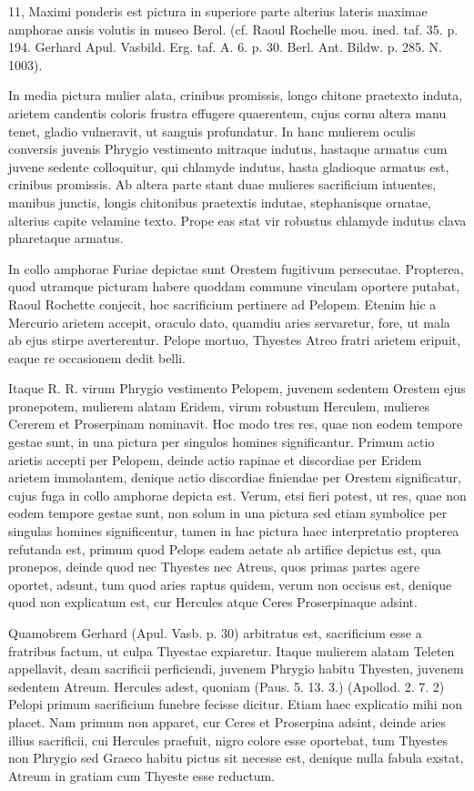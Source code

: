 \documentclass[landscape, a4paper, 11pt, oneside, polutonikogreek, german]{article}
\begin{document}
11, Maximi ponderis est pictura in superiore parte alterius lateris maximae amphorae ansis volutis in museo Berol. (cf. Raoul Rochelle mou. ined. taf. 35. p. 194. Gerhard Apul. Vasbild. Erg. taf. A. 6. p. 30. Berl. Ant. Bildw. p. 285. N. 1003).

In media pictura mulier alata, crinibus promissis, longo chitone praetexto induta, arietem candentis coloris frustra effugere quaerentem, cujus cornu altera manu tenet, gladio vulneravit, ut sanguis profundatur. In hanc mulierem oculis conversis juvenis Phrygio vestimento mitraque indutus, hastaque armatus cum juvene sedente colloquitur, qui chlamyde indutus, hasta gladioque armatus est, crinibus promissis. Ab altera parte stant duae mulieres sacrificium intuentes, manibus junctis, longis chitonibus praetextis indutae, stephanisque ornatae, alterius capite velamine texto. Prope eas stat vir robustus chlamyde indutus clava pharetaque armatus.

In collo amphorae Furiae depictae sunt Orestem fugitivum persecutae. Propterea, quod utramque picturam habere quoddam commune vinculam oportere putabat, Raoul Rochette conjecit, hoc sacrificium pertinere ad Pelopem. Etenim hic a Mercurio arietem accepit, oraculo dato, quamdiu aries servaretur, fore, ut mala ab ejus stirpe averterentur. Pelope mortuo, Thyestes Atreo fratri arietem eripuit, eaque re occasionem dedit belli.

Itaque R. R. virum Phrygio vestimento Pelopem, juvenem sedentem Orestem ejus pronepotem, mulierem alatam Eridem, virum robustum Herculem, mulieres Cererem et Proserpinam nominavit. Hoc modo tres res, quae non eodem tempore gestae sunt, in una pictura per singulos homines significantur. Primum actio arietis accepti per Pelopem, deinde actio rapinae et discordiae per Eridem arietem immolantem, denique actio discordiae finiendae per Orestem significatur, cujus fuga in collo amphorae depicta est. Verum, etsi fieri potest, ut res, quae non eodem tempore gestae sunt, non solum in una pictura sed etiam symbolice per singulas homines significentur, tamen in hac pictura haec interpretatio propterea refutanda est, primum quod Pelops eadem aetate ab artifice depictus est, qua pronepos, deinde quod nec Thyestes nec Atreus, quos primas partes agere oportet, adsunt, tum quod aries raptus quidem, verum non occisus est, denique quod non explicatum est, cur Hercules atque Ceres Proserpinaque adsint.

Quamobrem Gerhard (Apul. Vasb. p. 30) arbitratus est, sacrificium esse a fratribus factum, ut culpa Thyestae expiaretur. Itaque mulierem alatam Teleten appellavit, deam sacrificii perficiendi, juvenem Phrygio habitu Thyesten, juvenem sedentem Atreum. Hercules adest, quoniam (Paus. 5. 13. 3.) (Apollod. 2. 7. 2) Pelopi primum sacrificium funebre fecisse dicitur. Etiam haec explicatio mihi non placet. Nam primum non apparet, cur Ceres et Proserpina adsint, deinde aries illius sacrificii, cui Hercules praefuit, nigro colore esse oportebat, tum Thyestes non Phrygio sed Graeco habitu pictus sit necesse est, denique nulla fabula exstat, Atreum in gratiam cum Thyeste esse reductum.
\end{document}
